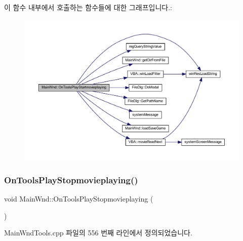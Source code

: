 이 함수 내부에서 호출하는 함수들에 대한 그래프입니다.\+:
\nopagebreak
\begin{figure}[H]
\begin{center}
\leavevmode
\includegraphics[width=350pt]{class_main_wnd_a96ea89975374d5b7a434070d58e9c260_cgraph}
\end{center}
\end{figure}
\mbox{\label{class_main_wnd_a82b88a60ca164731e9ccec3055e763c9}} 
\subsubsection{\texorpdfstring{On\+Tools\+Play\+Stopmovieplaying()}{OnToolsPlayStopmovieplaying()}}
{\footnotesize\ttfamily void Main\+Wnd\+::\+On\+Tools\+Play\+Stopmovieplaying (\begin{DoxyParamCaption}{ }\end{DoxyParamCaption})\hspace{0.3cm}{\ttfamily [protected]}}



Main\+Wnd\+Tools.\+cpp 파일의 556 번째 라인에서 정의되었습니다.


